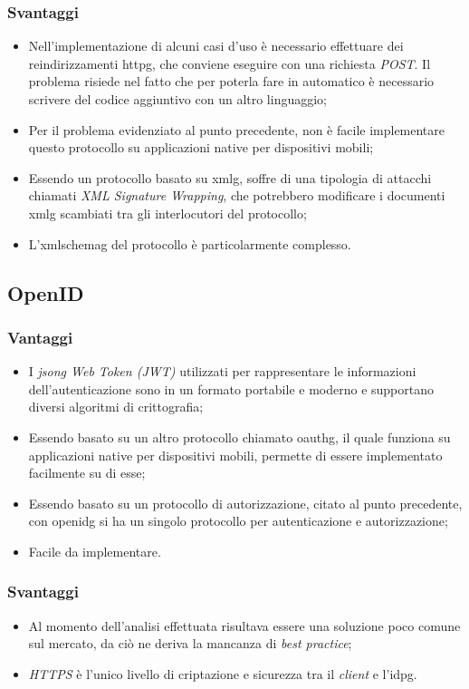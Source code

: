     \subsubsection{Svantaggi}\label{sec:saml_svantaggi}
    \begin{itemize}
        \item Nell'implementazione di alcuni casi d'uso è necessario effettuare dei reindirizzamenti \gls{httpg}, che conviene eseguire con una richiesta \textit{POST}. Il problema risiede nel fatto che per poterla fare in automatico è necessario scrivere del codice aggiuntivo con un altro linguaggio;
        \item Per il problema evidenziato al punto precedente, non è facile implementare questo protocollo su applicazioni native per dispositivi mobili;
        \item Essendo un protocollo basato su \gls{xmlg}, soffre di una tipologia di attacchi chiamati \textit{XML Signature Wrapping}, che potrebbero modificare i documenti \gls{xmlg} scambiati tra gli interlocutori del protocollo;
        \item L'\gls{xmlschemag} del protocollo è particolarmente complesso.
    \end{itemize}

\subsection{OpenID}
    \subsubsection{Vantaggi}
    \begin{itemize}
        \setlength\itemsep{0em}
        \item I \textit{\gls{jsong} Web Token (JWT)} utilizzati per rappresentare le informazioni dell'autenticazione sono in un formato portabile e moderno e supportano diversi algoritmi di crittografia;
        \item Essendo basato su un altro protocollo chiamato \gls{oauthg}, il quale funziona su applicazioni native per dispositivi mobili, permette di essere implementato facilmente su di esse;
        \item Essendo basato su un protocollo di autorizzazione, citato al punto precedente, con \gls{openidg} si ha un singolo protocollo per autenticazione e autorizzazione;
        \item Facile da implementare.
    \end{itemize}
    \subsubsection{Svantaggi}
    \begin{itemize}
        \setlength\itemsep{0em}
        \item Al momento dell'analisi effettuata risultava essere una soluzione poco comune sul mercato, da ciò ne deriva la mancanza di \textit{best practice};
        \item \textit{HTTPS} è l'unico livello di criptazione e sicurezza tra il \textit{client} e l'\gls{idpg}.
    \end{itemize}


